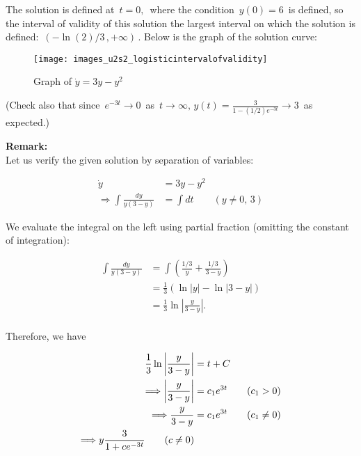 The solution is defined at $\, t = 0,\,$
where the condition $\, y(0)=6 \,$ is defined,
so the interval of validity of this solution the largest interval
on which the solution is defined: $\, (− \ln⁡(2)/3\, ,+\infty)\,$.
Below is the graph of the solution curve:

\begin{figure}[ht!]
  \centering
  \texttt{[image: images\_u2s2\_logisticintervalofvalidity]}
  \caption{Graph of $\dot y = 3y - y^2$}
\end{figure}

(Check also that since $\, e^{-3t} \to 0\,$ as
$\,t \to \infty, \, y(t)= \frac{3}{1−(1/2)e^{−3t}} \to 3\,$ as expected.)

\textbf{Remark:}\\
Let us verify the given solution by separation of variables:

\begin{align*}
  \dot y &= 3y - y^2 \\
  \Longrightarrow \int \frac{dy}{y(3-y)} &= \int dt \qquad (y \neq 0,\,3)
\end{align*}

We evaluate the integral on the left using partial fraction (omitting the constant of integration):

\begin{align*}
  \int \frac{dy}{y(3-y)} &= \int \left( \frac{1/3}{y} + \frac{1/3}{3 -y} \right) \\
                         &= \frac{1}{3}(\ln |y| - \ln |3 - y|) \\
                         &= \frac{1}{3}\ln \left| \frac{y}{3-y} \right|.  \\
\end{align*}

Therefore, we have

\begin{align*}
  \displaystyle \frac{1}{3}\ln \left|\frac{y}{3-y}\right|
  \displaystyle &= \displaystyle t + C \\
  \displaystyle \Longrightarrow
  \displaystyle  \left|\frac{y}{3-y}\right|
  \displaystyle &= \displaystyle  c_1 e^{3t}\qquad (c_1>0)\\
  \displaystyle \Longrightarrow
  \displaystyle  \frac{y}{3-y}
  \displaystyle &= \displaystyle  c_1 e^{3t}\qquad (c_1\neq 0) \\
  \displaystyle \Longrightarrow y 
  \displaystyle \frac{3}{1+ce^{-3t}}\qquad (c \neq 0)
\end{align*}

